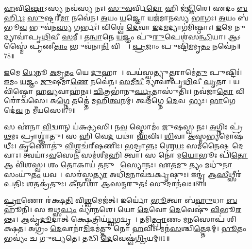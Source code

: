 \ul{𑌹}𑌵𑌿\ul{𑌷𑍋}𑌽𑌸𑍍𑌯 𑌨𑌵॑𑌸𑍍𑌯 𑌨𑌃।
\ul{𑌸𑍁}\ul{𑌵}𑌰𑍍𑌵𑌿\ul{𑌦𑍋} 𑌹𑌿 𑌜॑\ul{𑌜𑍍𑌞𑌿}𑌰𑍇।
𑌏𑌦𑌂 \ul{𑌬}\ul{𑌰𑍍}𑌹𑌿𑌃 \ul{𑌸𑍁}𑌷𑍍𑌟𑌰𑍀॑\ul{𑌮𑌾} 𑌨𑌵𑍇॑𑌨।
\ul{𑌅}𑌯𑌂 \ul{𑌯}𑌜𑍍𑌞𑍋 𑌯𑌜॑𑌮𑌾𑌨𑌸𑍍𑌯 \ul{𑌭𑌾}𑌗𑌃।
\ul{𑌅}𑌯𑌂 𑌬॑𑌭𑍂\ul{𑌵} 𑌭𑍁𑌵॑𑌨\ul{𑌸𑍍𑌯} 𑌗𑌰𑍍𑌭𑌃॑।
𑌵𑌿𑌶𑍍𑌵𑍇॑ \ul{𑌦𑍇}𑌵𑌾 \ul{𑌇}𑌦\ul{𑌮}𑌦𑍍𑌯𑌾𑌗॑𑌮𑌿𑌷𑍍𑌠𑌾𑌃।
\ul{𑌇}𑌮𑍇 𑌨𑍁 𑌦𑍍𑌯𑌾𑌵𑌾॑𑌪𑍃\ul{𑌥𑌿}𑌵𑍀 \ul{𑌸}𑌮𑍀𑌚𑍀᳚।
\ul{𑌤}\ul{𑌨𑍍𑌵𑌾}𑌨𑍇 \ul{𑌯}𑌜𑍍𑌞𑌂 𑌪𑍁॑\ul{𑌰𑍁}𑌪𑍇𑌶॑𑌸\ul{𑌨𑍍𑌧𑌿}𑌯𑌾।
𑌆𑌽𑌸𑍍𑌮𑍈॑ 𑌪𑍃𑌣𑍀\ul{𑌤𑌾𑌂} 𑌭𑍁𑌵॑𑌨𑌾\ul{𑌨𑌿} 𑌵𑌿𑌶𑍍𑌵𑌾᳚।
\ul{𑌪𑍍𑌰}𑌜𑌾𑌂 𑌪𑍁𑌷𑍍𑌟𑌿॑\ul{𑌮}𑌮𑍃\ul{𑌤𑌂} 𑌨𑌵𑍇॑𑌨॥78॥

\ul{𑌇}𑌮𑍇 \ul{𑌧𑍇}𑌨𑍂 \ul{𑌅}𑌮𑍃\ul{𑌤𑌂} 𑌯𑍇 \ul{𑌦𑍁}𑌹𑌾𑌤𑍇᳚।
𑌪𑌯॑𑌸𑍍𑌵𑌤𑍍𑌯𑍁\ul{𑌤𑍍𑌤}𑌰𑌾𑌮𑍇॑\ul{𑌤𑍁} 𑌪𑍁𑌷𑍍𑌟𑌿𑌃॑।
\ul{𑌇}𑌮𑌂 \ul{𑌯}𑌜𑍍𑌞𑌂 \ul{𑌜𑍁}𑌷𑌮𑌾॑\ul{𑌣𑍇} 𑌨𑌵𑍇॑𑌨।
\ul{𑌸}𑌮𑍀\ul{𑌚𑍀} 𑌦𑍍𑌯𑌾𑌵𑌾॑𑌪𑍃\ul{𑌥𑌿}𑌵𑍀 \ul{𑌘𑍃}𑌤𑌾𑌚𑍀᳚।
𑌯𑌵𑌿॑𑌷𑍍𑌠𑍋 𑌹\ul{𑌵𑍍𑌯}𑌵𑌾𑌹॑𑌨𑌃।
\ul{𑌚𑌿}𑌤𑍍𑌰𑌭𑌾॑𑌨𑍁\ul{𑌰𑍍𑌘𑍃}𑌤𑌾𑌸𑍁॑𑌤𑌿𑌃।
𑌨𑌵॑𑌜𑌾\ul{𑌤𑍋} 𑌵𑌿 𑌰𑍋॑𑌚𑌸𑍇।
𑌅\ul{𑌗𑍍𑌨𑍇} 𑌤𑌤𑍍𑌤𑍇॑ 𑌮𑌹𑌿\ul{𑌤𑍍𑌵}𑌨𑌮𑍍।
𑌤𑍍𑌵𑌮॑𑌗𑍍𑌨𑍇 \ul{𑌦𑍇}𑌵𑌤𑌾᳚𑌭𑍍𑌯𑌃।
\ul{𑌭𑌾}𑌗𑍇 𑌦𑍇॑\ul{𑌵} 𑌨 𑌮𑍀॑𑌯𑌸𑍇॥79॥

𑌸 𑌏॑𑌨𑌾 \ul{𑌵𑌿}𑌦𑍍𑌵𑌾𑌨𑍍 𑌯॑𑌕𑍍𑌷𑍍𑌯𑌸𑌿।
𑌨\ul{𑌵}\ul{} 𑌸𑍍𑌤𑍋𑌮𑌂॑ 𑌜𑍁𑌷𑌸𑍍𑌵 𑌨𑌃।
\ul{𑌅}𑌗𑍍𑌨𑌿𑌃 𑌪𑍍𑌰॑\ul{𑌥}𑌮𑌃 𑌪𑍍𑌰𑌾𑌶𑍍𑌞𑌾॑𑌤𑍁।
𑌸 𑌹𑌿 𑌵𑍇\ul{𑌦} 𑌯𑌥𑌾॑ \ul{𑌹}𑌵𑌿𑌃।
\ul{𑌶𑌿}𑌵𑌾 \ul{𑌅}𑌸𑍍𑌮\ul{𑌭𑍍𑌯}𑌮𑍋𑌷॑𑌧𑍀𑌃।
\ul{𑌕𑍃}𑌣𑍋𑌤𑍁॑ \ul{𑌵𑌿}𑌶𑍍𑌵𑌚॑𑌰𑍍‌\mbox{}𑌷𑌣𑌿𑌃।
\ul{𑌭}𑌦𑍍𑌰𑌾\ul{𑌨𑍍𑌨𑌃} 𑌶𑍍𑌰𑍇\ul{𑌯𑌃} 𑌸𑌮॑𑌨𑍈𑌷𑍍𑌟 𑌦𑍇𑌵𑌾𑌃।
𑌤𑍍𑌵𑌯𑌾॑\-𑌽\ul{𑌵}𑌸𑍇\ul{𑌨} 𑌸𑌮॑𑌶𑍀𑌮𑌹𑌿 𑌤𑍍𑌵𑌾।
𑌸 𑌨𑍋॑ 𑌮\ul{𑌯𑍋}𑌭𑍂𑌃 𑌪𑌿॑\ul{𑌤𑍋} 𑌆 𑌵𑌿॑𑌶𑌸𑍍𑌵।
𑌶𑌂 \ul{𑌤𑍋}𑌕𑌾𑌯॑ \ul{𑌤}𑌨𑍁𑌵𑍇᳚ \ul{𑌸𑍍𑌯𑍋}𑌨𑌃।
\ul{𑌏}𑌤\ul{𑌮𑍁} 𑌤𑍍𑌯𑌂 𑌮𑌧𑍁॑\ul{𑌨𑌾} 𑌸𑌂𑌯𑍁॑\ul{𑌤𑌂} 𑌯𑌵𑌮𑍍᳚।
𑌸𑌰॑𑌸𑍍𑌵\ul{𑌤𑍍𑌯𑌾} 𑌅𑌧𑌿॑\ul{𑌮}𑌨𑌾𑌵॑𑌚𑌰𑍍𑌕𑍃𑌷𑍁𑌃।
𑌇𑌨𑍍𑌦𑍍𑌰॑ 𑌆\ul{𑌸𑍀}𑌥𑍍𑌸𑍀𑌰॑𑌪𑌤𑌿𑌃 \ul{𑌶}𑌤𑌕𑍍𑌰॑𑌤𑍁𑌃।
\ul{𑌕𑍀}𑌨𑌾𑌶𑌾॑ 𑌆𑌸\ul{𑌨𑍍𑌮}𑌰𑍁𑌤𑌃॑ \ul{𑌸𑍁}𑌦𑌾𑌨॑𑌵𑌃॥80॥\anuvakamend[\ul{𑌪𑍁}\ul{𑌰}\ul{𑌏}𑌤𑌾 𑌵𑍃॑𑌣𑍀𑌮𑌹𑍇 \ul{𑌜𑍁}𑌷𑍇𑌥𑌾᳚𑌨𑍍𑌤𑌰𑍍𑌪𑌯\ul{𑌤𑌾}𑌮𑍃\ul{𑌤}𑌨𑍍𑌨𑌵𑍇॑𑌨 𑌮𑍀𑌯𑌸𑍇 \ul{𑌸𑍍𑌯𑍋}𑌨\ul{𑌶𑍍𑌚}𑌤𑍍𑌵𑌾𑌰𑌿॑ 𑌚]




\clearpage
{}
\setcounter{anuvakam}{0}

\ul{𑌪𑍍𑌰𑌾}𑌣𑍋 𑌰॑𑌕𑍍𑌷\ul{𑌤𑌿} 𑌵𑌿\ul{𑌶𑍍𑌵}𑌮𑍇𑌜॑𑌤𑍍।
𑌇𑌰𑍍𑌯𑍋॑ \ul{𑌭𑍂}𑌤𑍍𑌵𑌾 𑌬॑\ul{𑌹𑍁}𑌧𑌾 \ul{𑌬}𑌹𑍂𑌨𑌿॑।
𑌸 𑌇𑌥𑍍𑌸\ul{𑌰𑍍𑌵𑌂} 𑌵𑍍𑌯𑌾॑𑌨𑌶𑍇।
𑌯𑍋 \ul{𑌦𑍇}𑌵𑍋 \ul{𑌦𑍇}𑌵𑍇𑌷𑍁॑ \ul{𑌵𑌿}𑌭𑍂\ul{𑌰}𑌨𑍍𑌤𑌃।
𑌆𑌵𑍃॑\ul{𑌦𑍂}𑌦𑌾𑌤𑍍 𑌕𑍍𑌷𑍇𑌤𑍍𑌰𑌿𑌯॑\ul{𑌧𑍍𑌵}𑌗𑌦𑍍𑌵𑍃𑌷𑌾᳚।
𑌤𑌮𑌿\ul{𑌤𑍍𑌪𑍍𑌰𑌾}𑌣𑌂 𑌮\ul{𑌨}𑌸𑍋𑌪॑ 𑌶𑌿𑌕𑍍𑌷𑌤।
𑌅𑌗𑍍𑌰𑌂॑ \ul{𑌦𑍇}𑌵𑌾𑌨𑌾॑\ul{𑌮𑌿}𑌦𑌮॑𑌤𑍍𑌤𑍁 𑌨𑍋 \ul{𑌹}𑌵𑌿𑌃।
𑌮𑌨॑\ul{𑌸}𑌶𑍍𑌚𑌿\ul{𑌤𑍍𑌤𑍇}𑌦𑌮𑍍।
\ul{𑌭𑍂}𑌤𑌂 𑌭𑌵𑍍𑌯𑌂॑ 𑌚 𑌗𑍁𑌪𑍍𑌯𑌤𑍇।
𑌤𑌦𑍍𑌧𑌿 \ul{𑌦𑍇}𑌵𑍇𑌷𑍍𑌵॑\ul{𑌗𑍍𑌰𑌿}𑌯𑌮𑍍॥1॥

